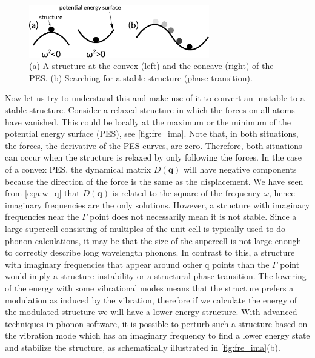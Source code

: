 \begin{figure}[htb] 
\centering  
\includegraphics[width=0.7\textwidth]{fre_ima.eps}
\caption[A structure at the convex and the concave of the PES]{ (a) A structure at the convex (left) and the concave (right) of the PES. (b) Searching for a stable structure (phase transition).}  
\label{fig:fre_ima}
\end{figure} 

Now let us try to understand this and make use of it to convert an unstable to a stable structure. Consider a relaxed structure in which the forces on all atoms have vanished. This could be locally at the maximum or the minimum of the potential energy surface (PES), see \autoref{fig:fre_ima}. Note that, in both situations, the forces, the derivative of the PES curves, are zero. Therefore, both situations can occur when the structure is relaxed by only following the forces. In the case of a convex PES, the dynamical matrix $D(\mathbf{q})$ will have negative components because the direction of the force is the same as the displacement. We have seen from \autoref{eqa:w_q} that $D(\mathbf{q})$ is related to the square of the frequency $\omega$, hence imaginary frequencies are the only solutions. However, a structure with imaginary frequencies near the $\Gamma$ point does not necessarily mean it is not stable. Since a large supercell consisting of multiples of the unit cell is typically used to do phonon calculations, it may be that the size of the supercell is not large enough to correctly describe long wavelength phonons. In contrast to this, a structure with imaginary frequencies that appear around other q points than the $\Gamma$ point would imply a structure instability or a structural phase transition. The lowering of the energy with some vibrational modes means that the structure prefers a modulation as induced by the vibration, therefore if we calculate the energy of the modulated structure we will have a lower energy structure. With advanced techniques in phonon software\cite[e.g.][]{phonopya}, it is possible to perturb such a structure based on the vibration mode which has an imaginary frequency to find a lower energy state and stabilize the structure, as schematically illustrated in \autoref{fig:fre_ima}(b). 



